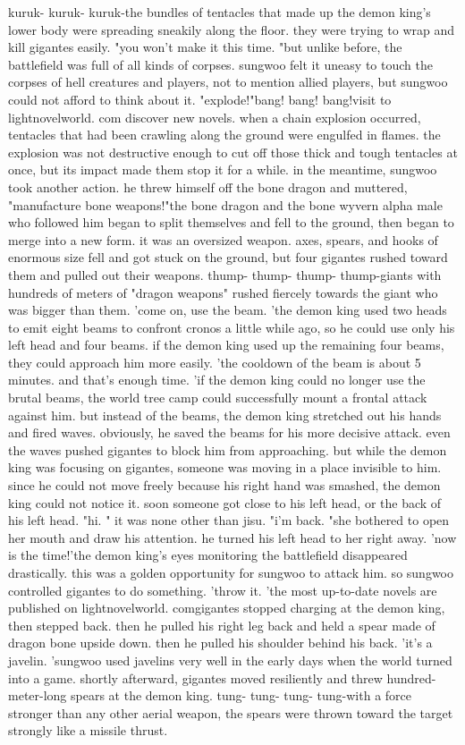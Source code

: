 kuruk- kuruk- kuruk-the bundles of tentacles that made up the demon king's lower body were spreading sneakily along the floor.
 they were trying to wrap and kill gigantes easily.
"you won't make it this time.
"but unlike before, the battlefield was full of all kinds of corpses.
 sungwoo felt it uneasy to touch the corpses of hell creatures and players, not to mention allied players, but sungwoo could not afford to think about it.
"explode!"bang! bang! bang!visit to lightnovelworld.
c­om discover new novels.
when a chain explosion occurred, tentacles that had been crawling along the ground were engulfed in flames.
 the explosion was not destructive enough to cut off those thick and tough tentacles at once, but its impact made them stop it for a while.
in the meantime, sungwoo took another action.
 he threw himself off the bone dragon and muttered, "manufacture bone weapons!"the bone dragon and the bone wyvern alpha male who followed him began to split themselves and fell to the ground, then began to merge into a new form.
it was an oversized weapon.
 axes, spears, and hooks of enormous size fell and got stuck on the ground, but four gigantes rushed toward them and pulled out their weapons.
thump- thump- thump- thump-giants with hundreds of meters of "dragon weapons" rushed fiercely towards the giant who was bigger than them.
'come on, use the beam.
'the demon king used two heads to emit eight beams to confront cronos a little while ago, so he could use only his left head and four beams.
if the demon king used up the remaining four beams, they could approach him more easily.
 'the cooldown of the beam is about 5 minutes.
 and that's enough time.
'if the demon king could no longer use the brutal beams, the world tree camp could successfully mount a frontal attack against him.
but instead of the beams, the demon king stretched out his hands and fired waves.
 obviously, he saved the beams for his more decisive attack.
 even the waves pushed gigantes to block him from approaching.
but while the demon king was focusing on gigantes, someone was moving in a place invisible to him.
 since he could not move freely because his right hand was smashed, the demon king could not notice it.
 soon someone got close to his left head, or the back of his left head.
"hi.
" it was none other than jisu.
 "i'm back.
"she bothered to open her mouth and draw his attention.
 he turned his left head to her right away.
 'now is the time!'the demon king's eyes monitoring the battlefield disappeared drastically.
 this was a golden opportunity for sungwoo to attack him.
 so sungwoo controlled gigantes to do something.
'throw it.
'the most up-to-date novels are published on lightnovelworld.
comgigantes stopped charging at the demon king, then stepped back.
 then he pulled his right leg back and held a spear made of dragon bone upside down.
 then he pulled his shoulder behind his back.
'it's a javelin.
'sungwoo used javelins very well in the early days when the world turned into a game.
 shortly afterward, gigantes moved resiliently and threw hundred-meter-long spears at the demon king.
tung- tung- tung- tung-with a force stronger than any other aerial weapon, the spears were thrown toward the target strongly like a missile thrust.



